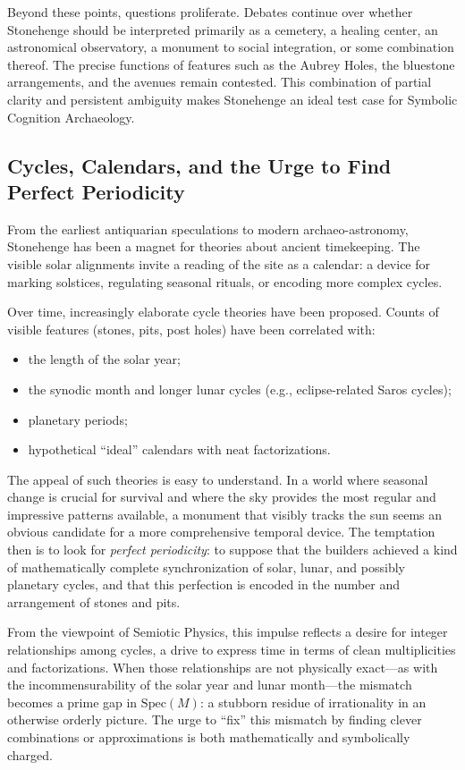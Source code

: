 \documentclass[12]{amsart}
\theoremstyle{plain}
\begin{document}
Beyond these points, questions proliferate. Debates continue over whether Stonehenge should be interpreted primarily as a cemetery, a healing center, an astronomical observatory, a monument to social integration, or some combination thereof. The precise functions of features such as the Aubrey Holes, the bluestone arrangements, and the avenues remain contested. This combination of partial clarity and persistent ambiguity makes Stonehenge an ideal test case for Symbolic Cognition Archaeology.

\subsection{Cycles, Calendars, and the Urge to Find Perfect Periodicity}

From the earliest antiquarian speculations to modern archaeo-astronomy, Stonehenge has been a magnet for theories about ancient timekeeping. The visible solar alignments invite a reading of the site as a calendar: a device for marking solstices, regulating seasonal rituals, or encoding more complex cycles.

Over time, increasingly elaborate cycle theories have been proposed. Counts of visible features (stones, pits, post holes) have been correlated with:

\begin{itemize}
  \item the length of the solar year;
  \item the synodic month and longer lunar cycles (e.g., eclipse-related Saros cycles);
  \item planetary periods;
  \item hypothetical ``ideal'' calendars with neat factorizations.
\end{itemize}

The appeal of such theories is easy to understand. In a world where seasonal change is crucial for survival and where the sky provides the most regular and impressive patterns available, a monument that visibly tracks the sun seems an obvious candidate for a more comprehensive temporal device. The temptation then is to look for \emph{perfect periodicity}: to suppose that the builders achieved a kind of mathematically complete synchronization of solar, lunar, and possibly planetary cycles, and that this perfection is encoded in the number and arrangement of stones and pits.

From the viewpoint of Semiotic Physics, this impulse reflects a desire for integer relationships among cycles, a drive to express time in terms of clean multiplicities and factorizations. When those relationships are not physically exact---as with the incommensurability of the solar year and lunar month---the mismatch becomes a prime gap in $\mathrm{Spec}(M)$: a stubborn residue of irrationality in an otherwise orderly picture. The urge to ``fix'' this mismatch by finding clever combinations or approximations is both mathematically and symbolically charged.
\end{document}
